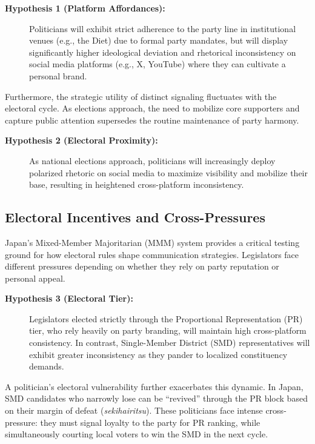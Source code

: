 \documentclass[11pt,letterpaper]{article}
\theoremstyle{plain}
\begin{document}
\begin{description}
    \item[\textbf{Hypothesis 1 (Platform Affordances):}] Politicians will exhibit strict adherence to the party line in institutional venues (e.g., the Diet) due to formal party mandates, but will display significantly higher ideological deviation and rhetorical inconsistency on social media platforms (e.g., X, YouTube) where they can cultivate a personal brand.
\end{description}

Furthermore, the strategic utility of distinct signaling fluctuates with the electoral cycle. As elections approach, the need to mobilize core supporters and capture public attention supersedes the routine maintenance of party harmony.

\begin{description}
    \item[\textbf{Hypothesis 2 (Electoral Proximity):}] As national elections approach, politicians will increasingly deploy polarized rhetoric on social media to maximize visibility and mobilize their base, resulting in heightened cross-platform inconsistency.
\end{description}

\subsection{Electoral Incentives and Cross-Pressures}
Japan's Mixed-Member Majoritarian (MMM) system provides a critical testing ground for how electoral rules shape communication strategies. Legislators face different pressures depending on whether they rely on party reputation or personal appeal.

\begin{description}
    \item[\textbf{Hypothesis 3 (Electoral Tier):}] Legislators elected strictly through the Proportional Representation (PR) tier, who rely heavily on party branding, will maintain high cross-platform consistency. In contrast, Single-Member District (SMD) representatives will exhibit greater inconsistency as they pander to localized constituency demands.
\end{description}

A politician's electoral vulnerability further exacerbates this dynamic. In Japan, SMD candidates who narrowly lose can be ``revived'' through the PR block based on their margin of defeat (\textit{sekihairitsu}). These politicians face intense cross-pressure: they must signal loyalty to the party for PR ranking, while simultaneously courting local voters to win the SMD in the next cycle.
\end{document}
